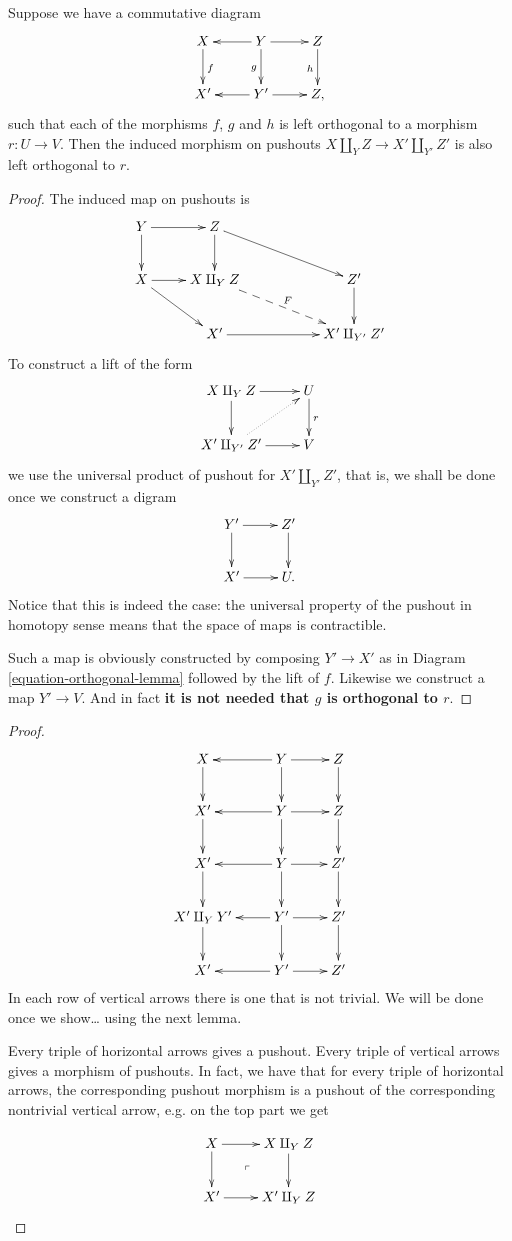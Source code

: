 \begin{lemma}
\label{lemma-orthogonality-for-pushout-diagram}
Suppose we have a commutative diagram
\begin{equation}
\label{equation-orthogonal-lemma}
\xymatrix{
X\ar[d]^f& Y \ar[l]\ar[d]_g \ar[r]& Z\ar[d]_h\\
X'&Y' \ar[l]\ar[r]&Z,
}
\end{equation}
such that each of the morphisms $f$, $g$ and $h$ 
is left orthogonal to a morphism $r:U \to V$.
Then the induced morphism on pushouts
$X \amalg_Y Z \to X' \amalg_{Y'}Z'$ is
also left orthogonal to $r$.
\end{lemma}

\begin{proof}
The induced map on pushouts is
$$
\xymatrix{
Y \ar[r] \ar[d] & Z \ar[d] \ar[rrd] & & \\
X \ar[r] \ar[rd]& X \amalg_Y Z \ar@{-->}[rrd]^F & & Z'\ar[d] \\
&X'\ar[rr]& & X' \amalg_{Y'}Z'
}
$$
To construct a lift of the form
$$
\xymatrix{
X \amalg_Y Z\ar[r]\ar[d]&U\ar[d]^r\\
X' \amalg_{Y'}Z'\ar[r]\ar@{.>}[ur]&V
}
$$
we use the universal product of pushout for $X' \amalg_{Y'}Z'$,
that is, we shall be done once we construct a digram
$$
\xymatrix{
Y'\ar[r]\ar[d]&Z'\ar[d]\\
X'\ar[r]&U.
}
$$
Notice that this is indeed the case:
the universal property of the pushout
in homotopy sense means that the space of maps
is contractible.

Such a map is obviously constructed by
composing $Y' \to X'$ as in Diagram \ref{equation-orthogonal-lemma}
followed by the lift of $f$. Likewise
we construct a map  $Y'\to V$.
And in fact
{\bf it is not needed that $g$ is orthogonal to $r$}.
\end{proof}

\begin{proof}
$$
\xymatrix{
X\ar[d]&Y \ar[l]\ar[d]\ar[r]&Z\ar[d]\\
X'\ar[d]&  Y \ar[l]\ar[d]\ar[r]&Z\ar[d]\\
X' \ar[d]&  Y \ar[l]\ar[d]\ar[r]& Z'\ar[d]\\
X'\amalg_Y Y'\ar[d]&  Y'\ar[l]\ar[d]\ar[r]& Z'\ar[d]\\
X'& Y'\ar[l]\ar[r]&Z'
}
$$
In each row of vertical arrows there is one that
is not trivial. We will be done once we show… using
the next lemma.

Every triple of horizontal arrows gives a pushout.
Every triple of vertical arrows gives a morphism of pushouts.
In fact, we have that for every triple
of horizontal arrows, the corresponding pushout
morphism is a pushout of the corresponding nontrivial
vertical arrow, e.g. on the top part we get

$$
\xymatrix{
X\ar[r]\ar[d]\ar@{}[dr]|-{\ulcorner}&X \amalg_YZ\ar[d]\\
X'\ar[r]&X'\amalg_YZ
}
$$

\end{proof}

